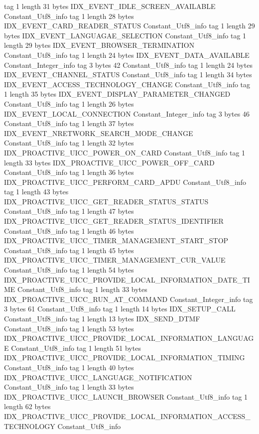 {{{			tag	1
			length	31
			bytes	IDX_EVENT_IDLE_SCREEN_AVAILABLE
		}
		Constant_Utf8_info {
			tag	1
			length	28
			bytes	IDX_EVENT_CARD_READER_STATUS
		}
		Constant_Utf8_info {
			tag	1
			length	29
			bytes	IDX_EVENT_LANGUAGAE_SELECTION
		}
		Constant_Utf8_info {
			tag	1
			length	29
			bytes	IDX_EVENT_BROWSER_TERMINATION
		}
		Constant_Utf8_info {
			tag	1
			length	24
			bytes	IDX_EVENT_DATA_AVAILABLE
		}
		Constant_Integer_info {
			tag	3
			bytes	42
		}
		Constant_Utf8_info {
			tag	1
			length	24
			bytes	IDX_EVENT_CHANNEL_STATUS
		}
		Constant_Utf8_info {
			tag	1
			length	34
			bytes	IDX_EVENT_ACCESS_TECHNOLOGY_CHANGE
		}
		Constant_Utf8_info {
			tag	1
			length	35
			bytes	IDX_EVENT_DISPLAY_PARAMETER_CHANGED
		}
		Constant_Utf8_info {
			tag	1
			length	26
			bytes	IDX_EVENT_LOCAL_CONNECTION
		}
		Constant_Integer_info {
			tag	3
			bytes	46
		}
		Constant_Utf8_info {
			tag	1
			length	37
			bytes	IDX_EVENT_NRETWORK_SEARCH_MODE_CHANGE
		}
		Constant_Utf8_info {
			tag	1
			length	32
			bytes	IDX_PROACTIVE_UICC_POWER_ON_CARD
		}
		Constant_Utf8_info {
			tag	1
			length	33
			bytes	IDX_PROACTIVE_UICC_POWER_OFF_CARD
		}
		Constant_Utf8_info {
			tag	1
			length	36
			bytes	IDX_PROACTIVE_UICC_PERFORM_CARD_APDU
		}
		Constant_Utf8_info {
			tag	1
			length	43
			bytes	IDX_PROACTIVE_UICC_GET_READER_STATUS_STATUS
		}
		Constant_Utf8_info {
			tag	1
			length	47
			bytes	IDX_PROACTIVE_UICC_GET_READER_STATUS_IDENTIFIER
		}
		Constant_Utf8_info {
			tag	1
			length	46
			bytes	IDX_PROACTIVE_UICC_TIMER_MANAGEMENT_START_STOP
		}
		Constant_Utf8_info {
			tag	1
			length	45
			bytes	IDX_PROACTIVE_UICC_TIMER_MANAGEMENT_CUR_VALUE
		}
		Constant_Utf8_info {
			tag	1
			length	54
			bytes	IDX_PROACTIVE_UICC_PROVIDE_LOCAL_INFORMATION_DATE_TIME
		}
		Constant_Utf8_info {
			tag	1
			length	33
			bytes	IDX_PROACTIVE_UICC_RUN_AT_COMMAND
		}
		Constant_Integer_info {
			tag	3
			bytes	61
		}
		Constant_Utf8_info {
			tag	1
			length	14
			bytes	IDX_SETUP_CALL
		}
		Constant_Utf8_info {
			tag	1
			length	13
			bytes	IDX_SEND_DTMF
		}
		Constant_Utf8_info {
			tag	1
			length	53
			bytes	IDX_PROACTIVE_UICC_PROVIDE_LOCAL_INFORMATION_LANGUAGE
		}
		Constant_Utf8_info {
			tag	1
			length	51
			bytes	IDX_PROACTIVE_UICC_PROVIDE_LOCAL_INFORMATION_TIMING
		}
		Constant_Utf8_info {
			tag	1
			length	40
			bytes	IDX_PROACTIVE_UICC_LANGUAGE_NOTIFICATION
		}
		Constant_Utf8_info {
			tag	1
			length	33
			bytes	IDX_PROACTIVE_UICC_LAUNCH_BROWSER
		}
		Constant_Utf8_info {
			tag	1
			length	62
			bytes	IDX_PROACTIVE_UICC_PROVIDE_LOCAL_INFORMATION_ACCESS_TECHNOLOGY
		}
		Constant_Utf8_info {
}}}
